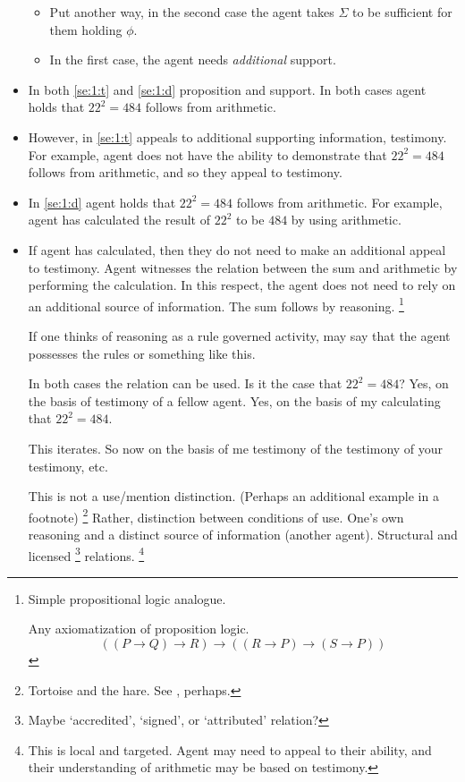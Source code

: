 \documentclass[10pt]{article}
\begin{document}
\begin{itemize}
{    \begin{itemize}
    \item Put another way, in the second case the agent takes \(\Sigma\) to be sufficient for them holding \(\phi\).
    \item In the first case, the agent needs \emph{additional} support.
    \end{itemize}
  }
\item In both \ref{se:1:t} and \ref{se:1:d} proposition and support.
  In both cases agent holds that \(22^{2} = 484\) follows from arithmetic.
\item However, in \ref{se:1:t} appeals to additional supporting information, testimony.
  For example, agent does not have the ability to demonstrate that \(22^{2} = 484\) follows from arithmetic, and so they appeal to testimony.
\item In \ref{se:1:d} agent holds that \(22^{2} = 484\) follows from arithmetic.
  For example, agent has calculated the result of \(22^{2}\) to be \(484\) by using arithmetic.
\item If agent has calculated, then they do not need to make an additional appeal to testimony.
  Agent witnesses the relation between the sum and arithmetic by performing the calculation.
  In this respect, the agent does not need to rely on an additional source of information.
  The sum follows by reasoning.\nolinebreak
  \footnote{
    Simple propositional logic analogue.

    Any axiomatization of proposition logic.
    \[
      ((P \rightarrow Q) \rightarrow R) \rightarrow ((R \rightarrow P) \rightarrow (S \rightarrow P))
    \]
    \cite{lukasiewicz:1948aa}
  }

  {
    \color{red}
    If one thinks of reasoning as a rule governed activity, may say that the agent possesses the rules or something like this.
  }

  In both cases the relation can be used.
  Is it the case that \(22^{2} = 484\)?
  Yes, on the basis of testimony of a fellow agent.
  Yes, on the basis of my calculating that \(22^{2} = 484\).

  This iterates.
  So now on the basis of me testimony of the testimony of your testimony, etc.

  This is not a use/mention distinction. (Perhaps an additional example in a footnote)\nolinebreak
  \footnote{
    Tortoise and the hare.
    See \cite{Simchen:2001aa}, perhaps.
  }
  Rather, distinction between conditions of use.
  One's own reasoning and a distinct source of information (another agent).
  Structural and licensed\nolinebreak
  \footnote{
    Maybe `accredited', `signed', or `attributed' relation?
  }
  relations.\nolinebreak
  \footnote{
    This is local and targeted.
    Agent may need to appeal to their ability, and their understanding of arithmetic may be based on testimony.

}
\end{itemize}
\end{document}
